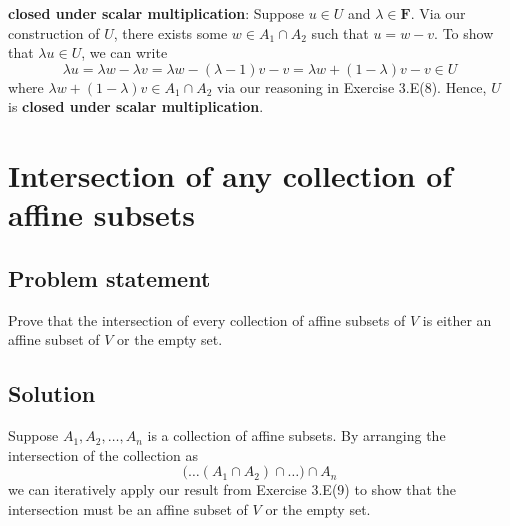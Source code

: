 \documentclass{article}
\begin{document}
\textbf{closed under scalar multiplication}: Suppose $u\in U$ and $\lambda\in\mathbf{F}$. 
Via our construction of $U$, there exists some $w\in A_1\cap A_2$ such that $u=w-v$. 
To show that $\lambda u\in U$, we can write
\[\lambda u=\lambda w - \lambda v=\lambda w - (\lambda -1)v-v=\lambda w+(1-\lambda)v-v\in U\]
where $\lambda w+(1-\lambda)v\in A_1\cap A_2$ via our reasoning in Exercise 3.E(8). 
Hence, $U$ is \textbf{closed under scalar multiplication}.

\clearpage

\section{Intersection of any collection of affine subsets}
\subsection*{Problem statement}
Prove that the intersection of every collection of affine subsets of $V$ is either an affine subset of $V$ or the empty set.

\subsection*{Solution}
Suppose $A_1,A_2,\ldots,A_n$ is a collection of affine subsets. 
By arranging the intersection of the collection as 
\[\big(\ldots(A_1\cap A_2)\cap\ldots\big)\cap A_n\]
we can iteratively apply our result from Exercise 3.E(9) to show that the intersection must be an affine subset of $V$ or the empty set.
\end{document}
